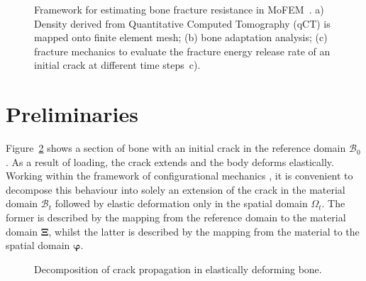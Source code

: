 \documentclass[review]{elsarticle}
\numberwithin{equation}{section}
\begin{document}
\begin{figure}[h]
	\centering
\caption{Framework for estimating bone fracture resistance in MoFEM~\citep{mofem2017}. a) Density derived from Quantitative Computed Tomography (qCT) is mapped onto finite element mesh; (b) bone adaptation analysis; (c) fracture mechanics to evaluate the fracture energy release rate of an initial crack at different time steps~c).}
\label{fig:framework}
\end{figure}

 
 \section{Preliminaries}
 
Figure~\ref{fig:domains4} shows a section of bone with an initial crack in the reference domain $\mathscr{B}_{0}$. As a result of loading, the crack extends and the body deforms elastically. Working within the framework of configurational mechanics \citep{kienzler2014configurational,kaczmarczyk2014three}, it is convenient to decompose this behaviour into solely an extension of the crack in the material domain  $\mathscr{B}_t$ followed by elastic deformation only in the spatial domain $\Omega_t$. The former is described by the mapping from the reference  domain to the material domain ${\boldsymbol\Xi}$, whilst the latter is described by the mapping from the material to the spatial domain ${\boldsymbol\varphi}$. 

\begin{figure}[th] \label{fig:domains4}
\setlength{\fboxsep}{0pt}%
\setlength{\fboxrule}{0pt}%
\begin{center}
\def\svgwidth{15cm} 	 
\end{center}
\caption{Decomposition of crack propagation in elastically deforming bone.}
\end{figure}
\end{document}
